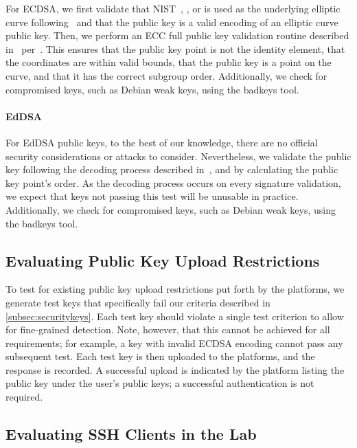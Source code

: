 For ECDSA, we first validate that NIST~\ptwofivesix, \pthreeeightfour, or \pfivetwoone is used as the underlying elliptic curve following~\cite[Section 6.1.5]{ca-browser-forum-2.1.2} and that the public key is a valid encoding of an elliptic curve public key. Then, we perform an ECC full public key validation routine described in~\cite[Section 5.6.2.3.3]{nist-sp-800-56a-3} per~\cite[Section 6.1.6]{ca-browser-forum-2.1.2}. This ensures that the public key point is not the identity element, that the coordinates are within valid bounds, that the public key is a point on the curve, and that it has the correct subgroup order. Additionally, we check for compromised keys, such as Debian weak keys, using the badkeys tool.


\paragraph{EdDSA}
For EdDSA public keys, to the best of our knowledge, there are no official security considerations or attacks to consider. Nevertheless, we validate the public key following the decoding process described in~\cite[Section 5.1.3]{rfc8032}, and by calculating the public key point's order. As the decoding process occurs on every signature validation, we expect that keys not passing this test will be unusable in practice. Additionally, we check for compromised keys, such as Debian weak keys, using the badkeys tool.

\subsection{Evaluating Public Key Upload Restrictions}
\label{sec:methodology:sub:restrictions}

To test for existing public key upload restrictions put forth by the platforms, we generate test keys that specifically fail our criteria described in \autoref{subsec:securitykeys}. Each test key should violate a single test criterion to allow for fine-grained detection. Note, however, that this cannot be achieved for all requirements; for example, a key with invalid ECDSA encoding cannot pass any subsequent test. Each test key is then uploaded to the platforms, and the response is recorded. A successful upload is indicated by the platform listing the public key under the user's public keys; a successful authentication is not required.

\subsection{Evaluating SSH Clients in the Lab}
\label{sec:methodology:sub:clients}

